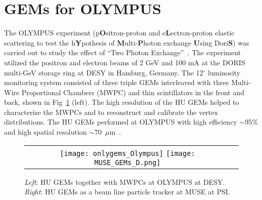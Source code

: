 \documentclass{PoS}
\begin{document}

\section{GEMs for OLYMPUS}

The OLYMPUS experiment (p{\bf{O}}sitron-proton and e{\bf{L}}ectron-proton
elastic scattering to test the h{\bf{Y}}pothesis of {\bf{M}}ulti-{\bf{P}}hoton
exchange {\bf{U}}sing Dori{\bf{S}}) was carried out to study the effect
of ``Two Photon Exchange''~\cite{OLYMPUS, hendersonH}.
The experiment utilized the positron and electron beams of 2 GeV and 100 mA
at the DORIS multi-GeV storage ring at DESY in Hamburg, Germany.
The 12$^\circ$ luminosity monitoring system consisted of three triple GEMs
interleaved with three Multi-Wire Proportional Chambers (MWPC) and thin
scintillators in the front and back, shown in Fig~\ref{Olymp1} (left).
The high resolution of the HU GEMs helped to characterize the MWPCs and to
reconstruct and calibrate the vertex distributions.
The HU GEMs performed at OLYMPUS with high efficiency
$\sim$95$\%$ and high spatial resolution
$\sim$70~$\mu$m~\cite{hendersonH, ozgur}.



 
 \begin{figure}[b] %
 \centering
 \begin{tabular}{cc}
 \mbox{\texttt{[image: onlygems\_Olympus]}}
 \mbox{\texttt{[image: MUSE\_GEMs\_D.png]}}
 \end{tabular}
 \caption{\emph{Left}: HU GEMs together with MWPCs at OLYMPUS at DESY.
   \emph{Right}: HU GEMs as a beam line particle tracker at MUSE at PSI.}
 \label{Olymp1}
 \end{figure}
\end{document}
